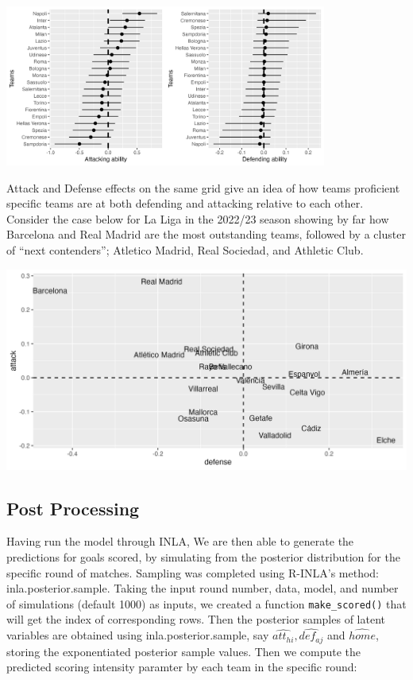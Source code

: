 \documentclass[
]{article}
\begin{document}
\begin{center}\includegraphics[width=400px]{saattdef} \end{center}

Attack and Defense effects on the same grid give an idea of how teams
proficient specific teams are at both defending and attacking relative
to each other. Consider the case below for La Liga in the 2022/23 season
showing by far how Barcelona and Real Madrid are the most outstanding
teams, followed by a cluster of ``next contenders''; Atletico Madrid,
Real Sociedad, and Athletic Club.

\includegraphics[width=33.33in]{joinedllattdef}

\hypertarget{post-processing}{%
\subsection{Post Processing}\label{post-processing}}

Having run the model through INLA, We are then able to generate the
predictions for goals scored, by simulating from the posterior
distribution for the specific round of matches. Sampling was completed
using R-INLA's method: inla.posterior.sample. Taking the input round
number, data, model, and number of simulations (default 1000) as inputs,
we created a function \texttt{make\_scored()} that will get the index of
corresponding rows. Then the posterior samples of latent variables are
obtained using inla.posterior.sample, say
\(\hat{att_{hi}},\hat{def_{aj}}\) and \(\hat{home}\), storing the
exponentiated posterior sample values. Then we compute the predicted
scoring intensity paramter by each team in the specific round:
\end{document}
